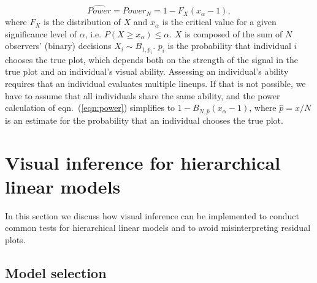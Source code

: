 \documentclass{article} %
\begin{document}
{\begin{equation}\label{eqn:power}
\widehat{Power} = {Power}_{N} = 1 - F_{X} (x_{\alpha} - 1),
\end{equation}
where $F_X$ is the distribution of $X$ and $x_\alpha$ is the critical value for a given significance level of $\alpha$, i.e. $P(X \ge x_{\alpha}) \le \alpha$. $X$ is composed of the sum of $N$ observers' (binary) decisions $X_i \sim B_{1, p_i}$.  $p_i$ is the probability that individual $i$ chooses the true plot, which  depends both on the strength of the signal in the true plot and an individual's visual ability.
Assessing an individual's ability requires that an individual evaluates multiple lineups. If that is not possible, we have to assume that all individuals share the same ability, and the power calculation of eqn.~(\ref{eqn:power}) simplifies to $1 - B_{N, \hat{p}}(x_\alpha-1)$, where $\widehat{p} = x/N$ is an estimate for the probability that an individual chooses the true plot.



}

\section{Visual inference for hierarchical linear models}

In this section we discuss how visual inference can be implemented to conduct common tests for hierarchical linear models and to avoid misinterpreting residual plots. 

\subsection{Model selection}
\end{document}
